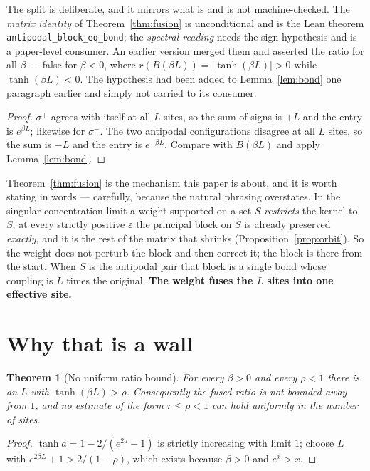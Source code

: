 \documentclass[11pt,a4paper]{article}
\theoremstyle{plain}
\newtheorem{theorem}{Theorem}[section]
\theoremstyle{definition}
\begin{document}
The split is deliberate, and it mirrors what is and is not machine-checked. The
\emph{matrix identity} of Theorem~\ref{thm:fusion} is unconditional and is the
Lean theorem \verb|antipodal_block_eq_bond|; the \emph{spectral reading} needs
the sign hypothesis and is a paper-level consumer. An earlier version merged
them and asserted the ratio for all $\beta$ --- false for $\beta<0$, where
$r(B(\beta L))=|\tanh(\beta L)|>0$ while $\tanh(\beta L)<0$. The hypothesis had
been added to Lemma~\ref{lem:bond} one paragraph earlier and simply not carried
to its consumer.

\begin{proof}
$\sigma^+$ agrees with itself at all $L$ sites, so the sum of signs is $+L$ and
the entry is $e^{\beta L}$; likewise for $\sigma^-$. The two antipodal
configurations disagree at all $L$ sites, so the sum is $-L$ and the entry is
$e^{-\beta L}$. Compare with $B(\beta L)$ and apply Lemma~\ref{lem:bond}.
\end{proof}

Theorem~\ref{thm:fusion} is the mechanism this paper is about, and it is worth
stating in words --- carefully, because the natural phrasing overstates. In the
singular concentration limit a weight supported on a set $S$ \emph{restricts} the
kernel to $S$; at every strictly positive $\varepsilon$ the principal block on
$S$ is already preserved \emph{exactly}, and it is the rest of the matrix that
shrinks (Proposition~\ref{prop:orbit}). So the weight does not perturb the block
and then correct it; the block is there from the start. When $S$ is the antipodal
pair that block is a single bond whose coupling is $L$ times the original.
\textbf{The weight fuses the $L$ sites into one effective site.}

\section{Why that is a wall}

\begin{theorem}[No uniform ratio bound]\label{thm:wall}
For every $\beta>0$ and every $\rho<1$ there is an $L$ with
$\tanh(\beta L)>\rho$. Consequently the fused ratio is not bounded away from
$1$, and no estimate of the form $r \le \rho <1$ can hold uniformly in the
number of sites.
\end{theorem}

\begin{proof}
$\tanh a = 1 - 2/(e^{2a}+1)$ is strictly increasing with limit $1$; choose $L$
with $e^{2\beta L}+1 > 2/(1-\rho)$, which exists because $\beta>0$ and
$e^{x}>x$.
\end{proof}
\end{document}
